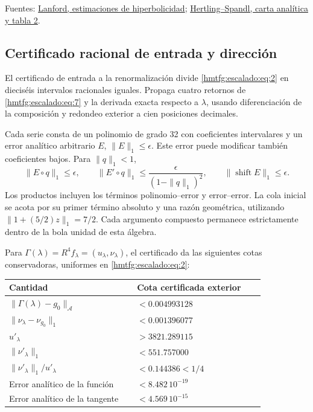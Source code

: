 Fuentes: \href{https://repo-archives.ihes.fr/A_GARDER/20180409/Test/I_Prepublications/LANFORD/1968-2013/P_81_17/P_81_17_web.pdf}{Lanford, estimaciones de hiperbolicidad}; \href{https://arxiv.org/pdf/1410.3277}{Hertling–Spandl, carta analítica y tabla 2}.


\subsection{Certificado racional de entrada y dirección}
\label{hmtfg:escalado:4}

El certificado de entrada a la renormalización divide \eqref{hmtfg:escalado:eq:2} en dieciséis intervalos racionales iguales. Propaga cuatro retornos de \eqref{hmtfg:escalado:eq:7} y la derivada exacta respecto a \(\lambda\), usando diferenciación de la composición y redondeo exterior a cien posiciones decimales.

Cada serie consta de un polinomio de grado 32 con coeficientes intervalares y un error analítico arbitrario \(E\), \(\|E\|_1\le\epsilon\). Este error puede modificar también coeficientes bajos. Para \(\|q\|_1<1\),
\begin{equation}
\|E\circ q\|_1\le\epsilon,\qquad
\|E'\circ q\|_1\le\frac{\epsilon}{(1-\|q\|_1)^2},\qquad
\|\operatorname{shift}E\|_1\le\epsilon.
\label{hmtfg:escalado:eq:10}
\end{equation}
Los productos incluyen los términos polinomio–error y error–error. La cola inicial se acota por su primer término absoluto y una razón geométrica, utilizando \(\|1+(5/2)z\|_1=7/2\). Cada argumento compuesto permanece estrictamente dentro de la bola unidad de esta álgebra.

Para \(\Gamma(\lambda)=R^4f_\lambda=(u_\lambda,\nu_\lambda)\), el certificado da las siguientes cotas conservadoras, uniformes en \eqref{hmtfg:escalado:eq:2}:

\begingroup\small
\begin{longtable}{p{0.465\linewidth}p{0.465\linewidth}}
\hline
Cantidad & Cota certificada exterior \\
\hline
\(\|\Gamma(\lambda)-g_0\|_{\mathcal A}\) & \(<0.004993128\) \\
\(\|\nu_\lambda-\nu_{g_0}\|_1\) & \(<0.001396077\) \\
\(u'_\lambda\) & \(>3821.289115\) \\
\(\|\nu'_\lambda\|_1\) & \(<551.757000\) \\
\(\|\nu'_\lambda\|_1/u'_\lambda\) & \(<0.144386<1/4\) \\
Error analítico de la función & \(<8.482\,10^{-19}\) \\
Error analítico de la tangente & \(<4.569\,10^{-15}\) \\
\hline\end{longtable}
\endgroup

